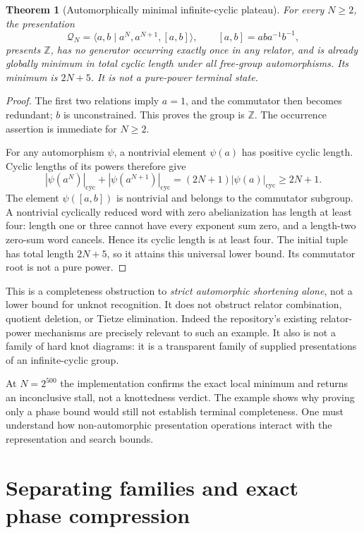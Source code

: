 \documentclass[11pt,letterpaper]{article}
\newtheorem{theorem}{Theorem}[section]
\theoremstyle{definition}
\theoremstyle{remark}\newtheorem{remark}[theorem]{Remark}
\newcommand{\Z}{\mathbb Z}
\newcommand{\calQ}{\mathcal Q}
\newcommand{\len}[1]{\left|#1\right|_{\mathrm{cyc}}}
\begin{document}
\begin{theorem}[Automorphically minimal infinite-cyclic plateau]
\label{thm:plateau}
For every $N\ge2$, the presentation
\begin{equation}
 \calQ_N=\langle a,b\mid a^N,a^{N+1},[a,b]\rangle,
 \qquad [a,b]=aba^{-1}b^{-1},
 \label{eq:plateau}
\end{equation}
presents $\Z$, has no generator occurring exactly once in any relator,
and is already globally minimum in total cyclic length under \emph{all}
free-group automorphisms. Its minimum is $2N+5$. It is not a pure-power
terminal state.
\end{theorem}
\begin{proof}
The first two relations imply $a=1$, and the commutator then becomes redundant;
$b$ is unconstrained. This proves the group is $\Z$. The occurrence assertion
is immediate for $N\ge2$.

For any automorphism $\psi$, a nontrivial element $\psi(a)$ has positive
cyclic length. Cyclic lengths of its powers therefore give
\[
 \len{\psi(a^N)}+\len{\psi(a^{N+1})}
    =(2N+1)\len{\psi(a)}\ge2N+1.
\]
The element $\psi([a,b])$ is nontrivial and belongs to the commutator subgroup.
A nontrivial cyclically reduced word with zero abelianization has length at
least four: length one or three cannot have every exponent sum zero, and a
length-two zero-sum word cancels. Hence its cyclic length is at least four.
The initial tuple has total length $2N+5$, so it attains this universal lower
bound. Its commutator root is not a pure power.
\end{proof}

This is a completeness obstruction to \emph{strict automorphic shortening
alone}, not a lower bound for unknot recognition. It does not obstruct
relator combination, quotient deletion, or Tietze elimination. Indeed the
repository's existing relator-power mechanisms are precisely relevant to
such an example. It also is not a family of hard knot diagrams: it is a
transparent family of supplied presentations of an infinite-cyclic group.

At $N=2^{500}$ the implementation confirms the exact local minimum and returns
an inconclusive stall, not a knottedness verdict. The example shows why
proving only a phase bound would still not establish terminal completeness.
One must understand how non-automorphic presentation operations interact with
the representation and search bounds.

\section{Separating families and exact phase compression}
\label{sec:families}
\end{document}
